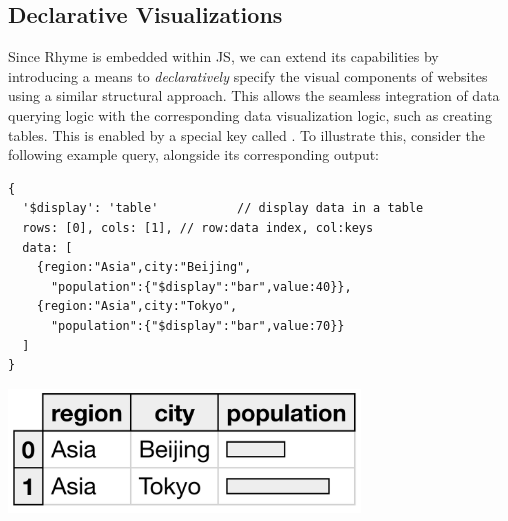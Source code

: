 \documentclass[runningheads]{llncs}
\newcommand{\lang}{Rhyme}
\begin{document}


\vspace{-3mm}
\subsection{Declarative Visualizations}\label{subsec:view}
Since \lang{} is embedded within JS, we can extend its capabilities by introducing
a means to \emph{declaratively} specify the visual components of websites using a similar
structural approach.
This allows the seamless integration of data querying logic with the corresponding
data visualization logic, such as creating tables.
This is enabled by a special key called .
To illustrate this, consider the following example query, alongside its corresponding output:

\hspace{-18pt}
\begin{minipage}{0.6\textwidth}
\begin{lstlisting}[style=JavaScript,columns=flexible]
{
  '$display': 'table'           // display data in a table
  rows: [0], cols: [1], // row:data index, col:keys
  data: [
    {region:"Asia",city:"Beijing",
      "population":{"$display":"bar",value:40}},
    {region:"Asia",city:"Tokyo",
      "population":{"$display":"bar",value:70}}
  ]
}
\end{lstlisting}
\end{minipage}%
\begin{minipage}{0.4\textwidth}
\includegraphics[width=0.7\textwidth]{images/small_table.png}
\end{minipage}
\end{document}
